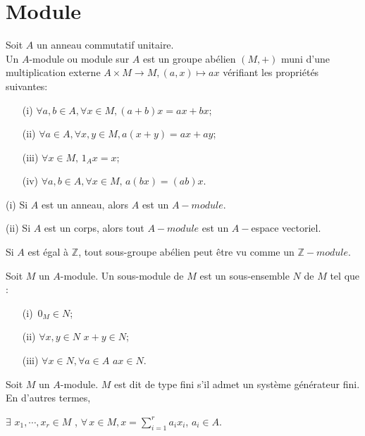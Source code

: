 \section{Module}
\begin{madefinition}
	Soit $A$ un anneau commutatif unitaire.\\
	Un $A$-module ou module sur $A$ est un groupe abélien $(M,+)$ muni d'une multiplication externe $A \times M \rightarrow M, (a,x) \mapsto ax$ vérifiant les propriétés suivantes:
	\begin{enumerate}
		\item[(i)]$ \forall a, b \in A, \forall x \in M,(a+b)x = ax+bx$;
		\item[(ii)] $ \forall a \in A, \forall x, y \in M,a(x+y) = ax+ay$;
		\item[(iii)] $ \forall x \in M, \,1_A x = x$;
		\item[(iv)] $\forall a, b \in A, \forall x \in M, \, a(bx)=(ab)x$.
	\end{enumerate}
\end{madefinition}
\begin{maremarque}
		\item[(i)] Si $A$ est un anneau, alors $A$ est un $A-module$.
		\item[(ii)] Si $A$ est un corps, alors tout $A-module$ est un $A-$espace vectoriel.
\end{maremarque}
\begin{monexemple}
		\item Si $A$ est égal à $\mathbb{Z}$, tout sous-groupe abélien peut être vu comme un $\mathbb{Z}-module.$
\end{monexemple}
\begin{madefinition}
	Soit $M$ un $A$-module. Un sous-module de $M$ est un sous-ensemble $N$ de $M$ tel que :
	\begin{enumerate}
		\item[(i)]$ \, 0_M \in N$;
		\item[(ii)]$ \forall x, y \in N \, \, x+y \in N$;
		\item[(iii)] $\forall x \in N, \forall a \in A \, \, ax \in N$.
	\end{enumerate}
\end{madefinition}
\begin{madefinition}
	Soit $M$ un $A$-module. $M$ est dit de type fini s'il admet un système générateur fini. En d'autres termes,
\begin{center}
		 $\exists  \, \, x_1, \cdots ,x_r \in M$ , $\forall \,  x \in M, x = \displaystyle \sum_{i=1}^{r}{a_i x_i}$, $a_i \in A$.
\end{center}
	 
\end{madefinition}
